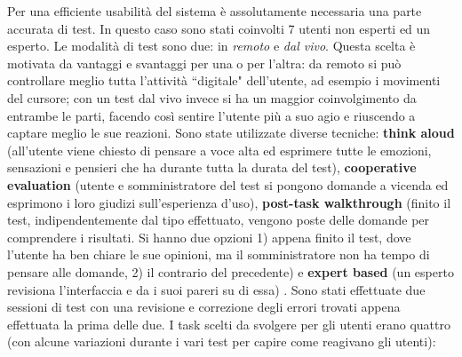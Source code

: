 \documentclass[a4paper,10pt]{memoir}
\begin{document}
Per una efficiente usabilità del sistema è assolutamente necessaria una parte accurata di test.
In questo caso sono stati coinvolti 7 utenti non esperti ed un esperto.
Le modalità di test sono due: in \textit{remoto} e \textit{dal vivo}. Questa scelta è motivata da vantaggi e svantaggi per una o per l'altra: da remoto si può controllare meglio tutta l'attività ``digitale" dell'utente, ad esempio i movimenti del cursore; con un test dal vivo invece si ha un maggior coinvolgimento da entrambe le parti, facendo così sentire l'utente più a suo agio e riuscendo a captare meglio le sue reazioni.
Sono state utilizzate diverse tecniche: \textbf{think aloud} (all'utente viene chiesto di pensare a voce alta ed esprimere tutte le emozioni, sensazioni e pensieri che ha durante tutta la durata del test), \textbf{cooperative evaluation} (utente e somministratore del test si pongono domande a vicenda ed esprimono i loro giudizi sull'esperienza d'uso), \textbf{post-task walkthrough} (finito il test, indipendentemente dal tipo effettuato, vengono poste delle domande per comprendere i risultati. Si hanno due opzioni 1) appena finito il test, dove l'utente ha ben chiare le sue opinioni, ma il somministratore non ha tempo di pensare alle domande, 2) il contrario del precedente) e \textbf{expert based} (un esperto revisiona l'interfaccia e da i suoi pareri su di essa) \cite{hcibook}.
Sono stati effettuate due sessioni di test con una revisione e correzione degli errori trovati appena effettuata la prima delle due.
I task scelti da svolgere per gli utenti erano quattro (con alcune variazioni durante i vari test per capire come reagivano gli utenti):
\end{document}
